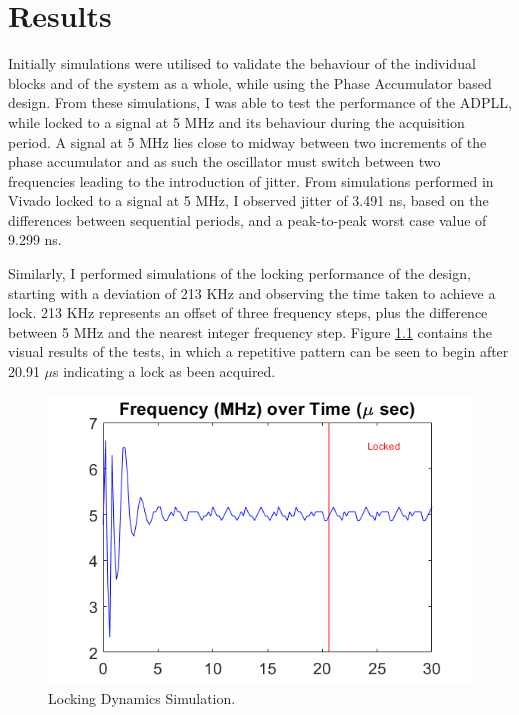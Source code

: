 \documentclass[11pt,english,british]{report}
\begin{document}
\chapter{Results}
Initially simulations were utilised to validate the behaviour of the individual blocks and of the system as a whole, while using the Phase Accumulator based design. From these simulations, I was able to test the performance of the ADPLL, while locked to a signal at 5 MHz and its behaviour during the acquisition period. A signal at 5 MHz lies close to midway between two increments of the phase accumulator and as such the oscillator must switch between two frequencies leading to the introduction of jitter. From simulations performed in Vivado locked to a signal at 5 MHz, I observed jitter of 3.491 ns, based on the differences between sequential periods, and a peak-to-peak worst case value of 9.299 ns.

Similarly, I performed simulations of the locking performance of the design, starting with a deviation of 213 KHz and observing the time taken to achieve a lock. 213 KHz represents an offset of three frequency steps, plus the difference between 5 MHz and the nearest integer frequency step. Figure \ref{fig:vivado_sim} contains the visual results of the tests, in which a repetitive pattern can be seen to begin after 20.91 $\mu$s indicating a lock as been acquired.
\begin{figure}[h]
	\centering
	\includegraphics[scale=0.45]{../sim_locking_rect}
	\caption{Locking Dynamics Simulation.}
	\label{fig:vivado_sim}
\end{figure}
\end{document}
